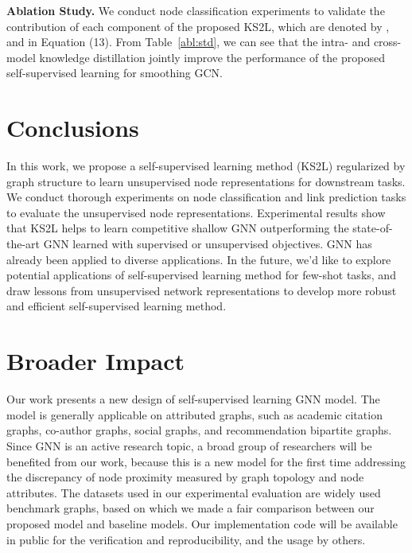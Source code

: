 \documentclass[preprint]{article}
\begin{document}
\textbf{Ablation Study.} We conduct node classification experiments to validate the contribution of each component of the proposed KS2L, which are denoted by ,  and   in Equation (13). From Table~\ref{abl:std}, we can see that the  intra- and cross-model knowledge distillation jointly improve the performance of the proposed self-supervised learning for smoothing GCN. 

\section{Conclusions}
In this work, we propose a self-supervised learning method (KS2L) regularized by graph structure to learn unsupervised node representations for downstream tasks. We conduct thorough experiments on node classification and link prediction tasks to evaluate the unsupervised node representations. Experimental results show that KS2L helps to learn competitive shallow GNN outperforming   the state-of-the-art GNN learned with supervised or unsupervised objectives. GNN has already been applied to diverse applications. In the future, we'd like to explore potential applications of self-supervised learning method for few-shot tasks, and draw lessons from unsupervised network representations to develop more robust and efficient self-supervised learning method.



\section*{Broader Impact}
Our work presents a new design of self-supervised learning GNN model. The model is generally applicable on attributed graphs, such as academic citation graphs, co-author graphs, social graphs, and recommendation bipartite graphs. Since GNN is an active research topic, a broad group of researchers will be benefited from our work, because this is a new model for the first time addressing the discrepancy of node proximity measured by graph topology and node attributes. The datasets used in our experimental evaluation are widely used benchmark graphs, based on which we made a  fair comparison between our proposed model and baseline models. Our implementation code will be available in public for the verification and reproducibility, and the usage by others.

\iffalse
Authors are required to include a statement of the broader impact of their work, including its ethical aspects and future societal consequences.
Authors should discuss both positive and negative outcomes, if any. For instance, authors should discuss
a)  who may benefit from this research,
b) who may be put at disadvantage from this research,
c) what are the consequences of failure of the system, and
d) whether the task/method leverages biases in the data. If authors believe this is not applicable to them, authors can simply state this.
\fi 
\end{document}
